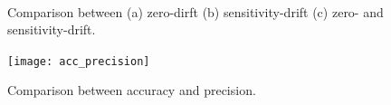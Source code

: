 \documentclass[a4paper,11pt]{book}
\begin{document}
\begin{figure}[h!]\label{fig:comparison}
   
    \label{fig:zdrift}\hfill
    \label{fig:sdrift}\\
   \label{fig:zsdrift}\hfill
  \caption{ Comparison between (a) zero-dirft (b) sensitivity-drift (c) zero- and sensitivity-drift.} 
\end{figure}

\begin{figure}[h!]\label{fig:comparison}
  \texttt{[image: acc\_precision]}
  \caption{ Comparison between accuracy and precision.} 
\end{figure}
\end{document}
